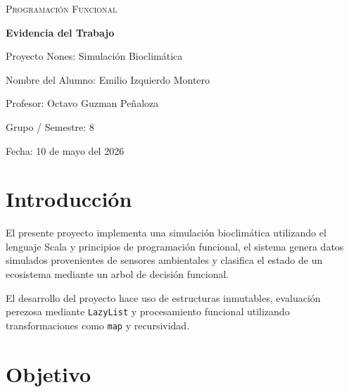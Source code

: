 \documentclass[12pt]{article}
\begin{document}

\begin{titlepage}
    \centering


    {\scshape\Large Programación Funcional \par}
    \vspace{1.5cm}

    {\huge\bfseries Evidencia del Trabajo \par}
    \vspace{0.5cm}

    {\Large Proyecto Nones: Simulación Bioclimática \par}

    \vfill

    {\large
    Nombre del Alumno: Emilio Izquierdo Montero \\
    \vspace{0.3cm}

    Profesor: Octavo Guzman Peñaloza \\
    \vspace{0.3cm}

    Grupo / Semestre: 8 \\
    \vspace{0.3cm}

    Fecha: 10 de mayo del 2026
    \par}

    \vfill

\end{titlepage}


\section{Introducción}

El presente proyecto implementa una simulación bioclimática utilizando el lenguaje Scala y principios de programación funcional, el sistema genera datos simulados provenientes de sensores ambientales y clasifica el estado de un ecosistema mediante un arbol de decisión funcional.

El desarrollo del proyecto hace uso de estructuras inmutables, evaluación perezosa mediante \texttt{LazyList} y procesamiento funcional utilizando transformaciones como \texttt{map} y recursividad.


\section{Objetivo}
\end{document}
